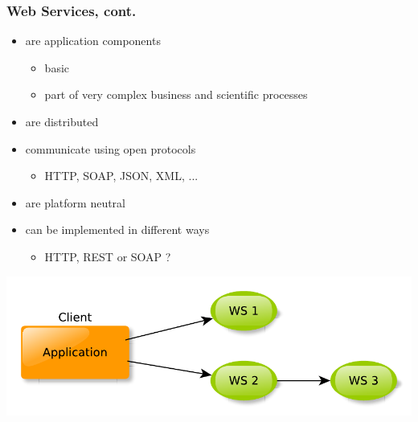 \documentclass{beamer}
\begin{document}
\begin{frame}\frametitle{Web Services, cont.} 
  \begin{itemize}
  
    \item are application components
    \begin{itemize}
      \item basic
      \item part of very complex business and scientific processes
    \end{itemize}                \pause
          
    \item are distributed        \pause
    
    \item communicate using open protocols
    \begin{itemize}
      \item HTTP, SOAP, JSON, XML, ...
    \end{itemize}                \pause
      
    \item are platform neutral
    
    \pause
    
    \item can be implemented in different ways
    \begin{itemize}
      \item HTTP, REST or SOAP ?
    \end{itemize}  
    
  \end{itemize}
  
  \pause
  
  \begin{center}
    \includegraphics[scale=0.55]{diagrams/app_web_services.pdf}  
  \end{center}
  
\end{frame}
\end{document}
